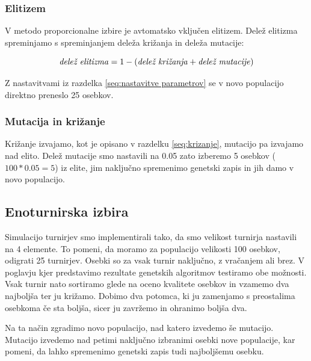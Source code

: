 \documentclass[a4paper, 12pt]{book}
\begin{document}
\newpage
\subsubsection{Elitizem}

V metodo proporcionalne izbire je avtomatsko vklju\v cen elitizem. Dele\v z elitizma spreminjamo s spreminjanjem dele\v za kri\v zanja in dele\v za mutacije: 

\begin{equation}
\label{eq:elitizem}
\textrm{\textit{dele\v z elitizma}} = 1 - (\textrm{\textit{dele\v z kri\v zanja}} + \textrm{\textit{dele\v z mutacije}})\end{equation}

Z nastavitvami iz razdelka \ref{seq:nastavitve parametrov} se v novo populacijo direktno preneslo 25 osebkov.

\subsubsection{Mutacija in kri\v zanje}

Kri\v zanje izvajamo, kot je opisano v razdelku \ref{seq:krizanje}, mutacijo pa izvajamo nad elito. Dele\v z mutacije smo nastavili na 0.05 zato izberemo 5 osebkov ($100*0.05 = 5$) iz elite, jim naklju\v cno spremenimo genetski zapis in jih damo v novo populacijo.

\subsection{Enoturnirska izbira}

Simulacijo turnirjev smo implementirali tako, da smo velikost turnirja nastavili na 4 elemente. To pomeni, da moramo za populacijo velikosti 100 osebkov, odigrati 25 turnirjev. Osebki so za vsak turnir naklju\v cno, z vra\v canjem ali brez. V poglavju kjer predstavimo rezultate genetskih algoritmov testiramo obe mo\v znosti. Vsak turnir nato sortiramo glede na oceno kvalitete osebkov in vzamemo dva najbolj\v sa ter ju kri\v zamo. Dobimo dva potomca, ki ju zamenjamo s preostalima osebkoma \v ce sta bolj\v sa, sicer ju zavr\v zemo in ohranimo bolj\v sa dva. 

Na ta na\v cin zgradimo novo populacijo, nad katero izvedemo \v se mutacijo. Mutacijo izvedemo nad petimi naklju\v cno izbranimi osebki nove populacije, kar pomeni, da lahko spremenimo genetski zapis tudi najbolj\v semu osebku.
\end{document}

